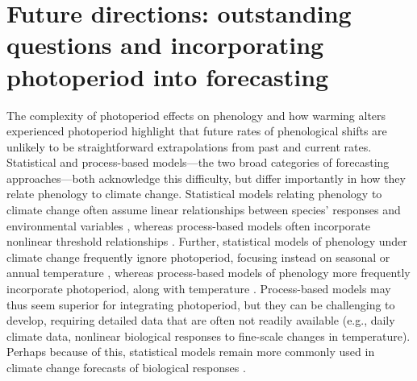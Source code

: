 \documentclass{article}
\begin{document}
\section*{Future directions: outstanding questions and incorporating photoperiod into forecasting}
\par The complexity of photoperiod effects on phenology and how warming alters experienced photoperiod highlight that future rates of phenological shifts are unlikely to be straightforward extrapolations from past and current rates. Statistical and process-based models---the two broad categories of forecasting approaches---both acknowledge this difficulty, but differ importantly in how they relate phenology to climate change. Statistical models relating phenology to climate change often assume linear relationships between species' responses and environmental variables \citep[e.g., ][]{flynn2018,ibanez2010}, whereas process-based models often incorporate nonlinear threshold relationships \citep[e.g.][]{chuine2001,morin2009}. Further, statistical models of phenology under climate change frequently ignore photoperiod, focusing instead on seasonal or annual temperature \citep[e.g.][but see \citet{richardson2013}]{diez2012,ibanez2010}, whereas process-based models of phenology more frequently incorporate photoperiod, along with temperature \citep{lundell2020,duputie2015,zhao2013,morin2009}. Process-based models may thus seem superior for integrating photoperiod, but they can be challenging to develop, requiring detailed data that are often not readily available (e.g., daily climate data, nonlinear biological responses to fine-scale changes in temperature). Perhaps because of this, statistical models remain more commonly used in climate change forecasts of biological responses \citep[e.g.,][]{garcia2016,Basler:2012,diez2012,zhu2012,ibanez2010}.
\end{document}
